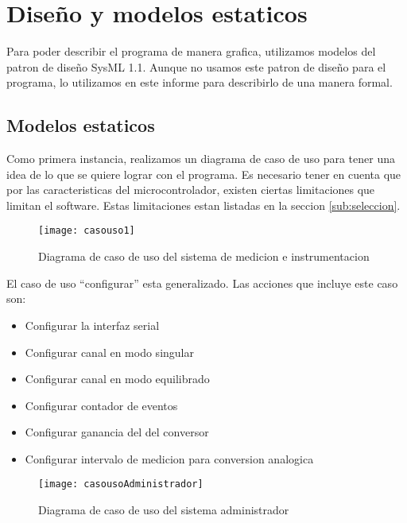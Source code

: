 \section{Diseño y modelos estaticos} %
\label{sec:diseno_y_modelos_estaticos}

Para poder describir el programa de manera grafica, utilizamos modelos del patron de diseño SysML 1.1. Aunque no usamos este patron de diseño para el programa, lo utilizamos en este informe para describirlo de una manera formal.

\subsection{Modelos estaticos} %
\label{sub:modelos_estaticos}

Como primera instancia, realizamos un diagrama de caso de uso para tener una idea de lo que se quiere lograr con el programa. Es necesario tener en cuenta que por las caracteristicas del microcontrolador, existen ciertas limitaciones que limitan el software. Estas limitaciones estan listadas en la seccion \ref{sub:seleccion}.

\begin{figure}[h]
  \centering
  \texttt{[image: casouso1]}
  \caption{Diagrama de caso de uso del sistema de medicion e instrumentacion}\label{fig:casouso1}
\end{figure}

El caso de uso ``configurar'' esta generalizado. Las acciones que incluye este caso son:
\begin{itemize}
  \item Configurar la interfaz serial
  \item Configurar canal en modo singular
  \item Configurar canal en modo equilibrado
  \item Configurar contador de eventos
  \item Configurar ganancia del del conversor
  \item Configurar intervalo de medicion para conversion analogica
\end{itemize}

\begin{figure}[h]
  \centering
  \texttt{[image: casousoAdministrador]}
  \caption{Diagrama de caso de uso del sistema administrador}\label{fig:casousoAdministrador}
\end{figure}

